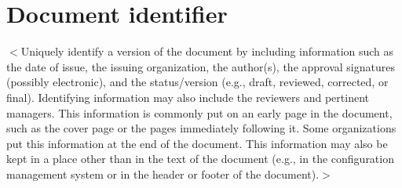 \documentclass{scrreprt}
\begin{document}
\section{Document identifier}
$<$Uniquely identify a version of the document by including information such as the date of issue, the issuing organization, the author(s), the approval signatures (possibly electronic), and the status/version (e.g., draft, reviewed, corrected, or final). Identifying information may also include the reviewers and pertinent managers. This information is commonly put on an early page in the document, such as the cover page or the pages immediately following it. Some organizations put this information at the end of the document. This information may also be kept in a place other than in the text of the document (e.g., in the configuration management system or in the header or footer of the document).$>$
\end{document}
